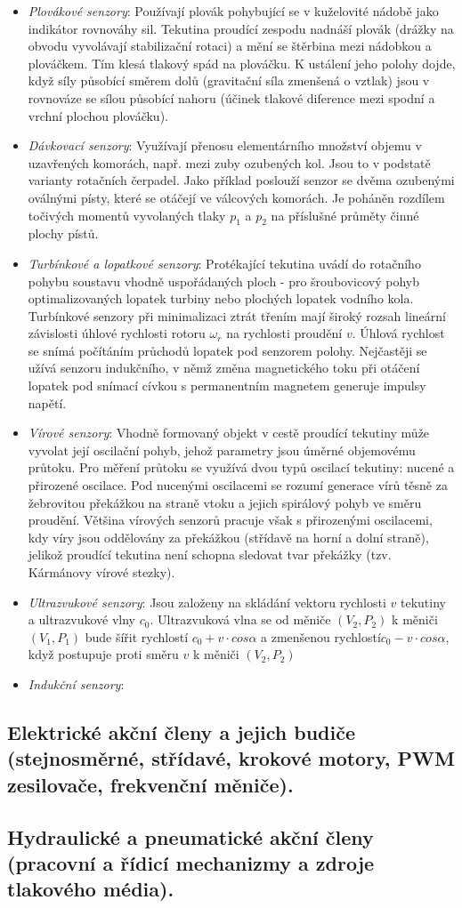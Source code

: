 \begin{itemize}
\item \textit{Plovákové senzory}: Používají plovák pohybující se v kuželovité nádobě jako indikátor rovnováhy sil. Tekutina proudící zespodu nadnáší plovák (drážky na obvodu vyvolávají stabilizační rotaci) a mění se štěrbina mezi nádobkou a plováčkem. Tím klesá tlakový spád na plováčku. K ustálení jeho polohy dojde, když síly působící směrem dolů (gravitační síla zmenšená o vztlak) jsou v rovnováze se sílou působící nahoru (účinek tlakové diference mezi spodní a vrchní plochou plováčku).
\item \textit{Dávkovací senzory}: Využívají přenosu elementárního množství objemu v uzavřených komorách, např. mezi zuby ozubených kol. Jsou to v podstatě varianty rotačních čerpadel. Jako příklad poslouží senzor se dvěma ozubenými oválnými písty, které se otáčejí ve válcových komorách. Je poháněn rozdílem točivých momentů vyvolaných tlaky $ p_1 $ a $ p_2 $ na příslušné průměty činné plochy pístů.
\item \textit{Turbínkové a lopatkové senzory}: Protékající tekutina uvádí do rotačního pohybu soustavu vhodně uspořádaných ploch - pro šroubovicový pohyb optimalizovaných lopatek turbiny nebo plochých lopatek vodního kola. Turbínkové senzory při minimalizaci ztrát třením mají široký rozsah lineární závislosti úhlové rychlosti rotoru $ \omega_r $ na rychlosti proudění $ v $. Úhlová rychlost se snímá počítáním průchodů lopatek pod senzorem polohy. Nejčastěji se užívá senzoru indukčního, v němž změna magnetického toku při otáčení lopatek pod snímací cívkou s permanentním magnetem generuje impulsy napětí.
\item \textit{Vírové senzory}: Vhodně formovaný objekt v cestě proudící tekutiny může vyvolat její oscilační pohyb, jehož parametry jsou úměrné objemovému průtoku. Pro měření průtoku se využívá dvou typů oscilací tekutiny: nucené a přirozené oscilace. Pod nucenými oscilacemi se rozumí generace vírů těsně za žebrovitou překážkou na straně vtoku a jejich spirálový pohyb ve směru proudění. Většina vírových senzorů pracuje však s přirozenými oscilacemi, kdy víry jsou oddělovány za překážkou (střídavě na horní a dolní straně), jelikož proudící tekutina není schopna sledovat tvar překážky (tzv. Kármánovy vírové stezky).
\item \textit{Ultrazvukové senzory}: Jsou založeny na skládání vektoru rychlosti $ v $ tekutiny a ultrazvukové vlny $ c_0 $. Ultrazvuková vlna se od měniče $ (V_2, P_2) $ k měniči $ (V_1, P_1) $ bude šířit rychlostí $ c_0 + v \cdot cos \alpha $ a zmenšenou rychlostí$ c_0 - v \cdot cos \alpha $, když postupuje proti směru $ v $ k měniči $ (V_2, P_2) $
\item \textit{Indukční senzory}: 
\end{itemize}

\subsection{Elektrické akční členy a jejich budiče (stejnosměrné, střídavé, krokové motory, PWM zesilovače, frekvenční měniče).}

\subsection{Hydraulické a pneumatické akční členy (pracovní a řídicí mechanizmy a zdroje tlakového média).}
